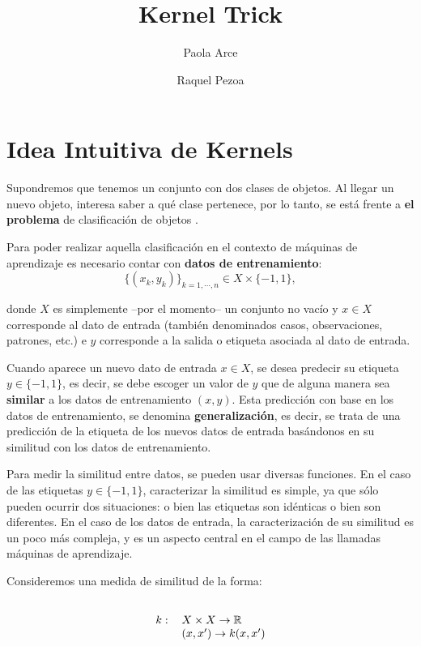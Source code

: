 \documentclass[12pt]{article}
\title{Kernel Trick}
\author{Paola Arce \and Raquel Pezoa}
\begin{document}
\maketitle

\section{Idea Intuitiva de Kernels}
Supondremos que tenemos un conjunto con dos clases de objetos. Al llegar un nuevo objeto, interesa saber a qué clase pertenece, por lo tanto, se está frente a \textbf{el problema} de clasificación de objetos \cite{smola}.

Para poder realizar aquella clasificación en el contexto de máquinas de aprendizaje es necesario contar con \textbf{datos de entrenamiento}: $$\{ (x_k,y_k)\}_{k=1,\cdots,n} \in X \times \{-1,1\},$$ 

\noindent donde $X$ es simplemente --por el momento-- un conjunto no vacío y $x \in X$ corresponde al dato de entrada (también denominados casos, observaciones, patrones, etc.) e $y$ corresponde a la salida o etiqueta asociada al dato de entrada.

Cuando aparece un nuevo dato de entrada $x \in X$, se desea predecir su etiqueta $y \in \{-1,1\}$, es decir, se debe escoger un valor de $y$ que de alguna manera sea \textbf{similar} a los datos de entrenamiento $(x,y)$. Esta predicción con base en los datos de entrenamiento, se denomina \textbf{generalización}, es decir, se trata de una predicción de la etiqueta de los nuevos datos de entrada basándonos en su similitud con los datos de entrenamiento.

Para medir la similitud entre datos, se pueden usar diversas funciones. En el caso de las etiquetas $y \in \{-1,1\}$, caracterizar la similitud es simple, ya que sólo pueden ocurrir dos situaciones: o bien las etiquetas son idénticas o bien son diferentes. En el caso de los datos de entrada, la caracterización de su similitud es un poco más compleja, y es un aspecto central en el campo de las llamadas máquinas de aprendizaje.

Consideremos una medida de similitud de la forma:

\begin{equation}
\begin{tabular}{ll} \\
$k:$ & $X \times X \rightarrow \mathbb{R}$ \\ 
   & $(x,x') \rightarrow k(x,x')$ \\
\end{tabular}
\end{equation}
\end{document}
